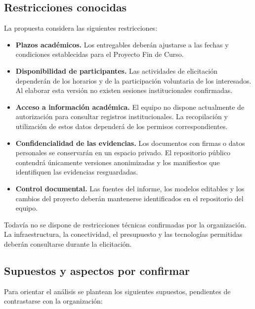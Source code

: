 \documentclass[11pt,a4paper]{article}
\begin{document}
\subsection{Restricciones conocidas}

La propuesta considera las siguientes restricciones:

\begin{itemize}

    \item \textbf{Plazos académicos.}
    Los entregables deberán ajustarse a las fechas
    y condiciones establecidas para el Proyecto
    Fin de Curso.

    \item \textbf{Disponibilidad de participantes.}
    Las actividades de elicitación dependerán de
    los horarios y de la participación voluntaria
    de los interesados. Al elaborar esta versión
    no existen sesiones institucionales confirmadas.

    \item \textbf{Acceso a información académica.}
    El equipo no dispone actualmente de autorización
    para consultar registros institucionales.
    La recopilación y utilización de estos datos
    dependerá de los permisos correspondientes.

    \item \textbf{Confidencialidad de las evidencias.}
    Los documentos con firmas o datos personales
    se conservarán en un espacio privado.
    El repositorio público contendrá únicamente
    versiones anonimizadas y los manifiestos
    que identifiquen las evidencias resguardadas.

    \item \textbf{Control documental.}
    Las fuentes del informe, los modelos editables
    y los cambios del proyecto deberán mantenerse
    identificados en el repositorio del equipo.

\end{itemize}

Todavía no se dispone de restricciones técnicas
confirmadas por la organización. La infraestructura,
la conectividad, el presupuesto y las tecnologías
permitidas deberán consultarse durante la elicitación.

\subsection{Supuestos y aspectos por confirmar}

Para orientar el análisis se plantean los siguientes
supuestos, pendientes de contrastarse con la organización:
\end{document}
